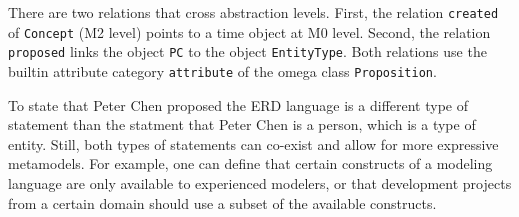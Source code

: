 There are two relations that cross abstraction levels. First, the relation {\tt created}
of {\tt Concept} (M2 level) points to a time object at M0 level. Second,
the relation {\tt proposed} links the object {\tt PC} to the object
{\tt EntityType}. Both relations use the builtin attribute category
{\tt attribute} of the omega class {\tt Proposition}. 


To state that Peter Chen proposed the ERD language is a different type of statement
than the statment that Peter Chen is a person, which is a type of entity.
Still, both types of statements can co-exist and allow for more expressive
metamodels. For example, one can define that certain constructs of a modeling
language are only available to experienced modelers, or that development
projects from a certain domain should use a subset of the available constructs.



